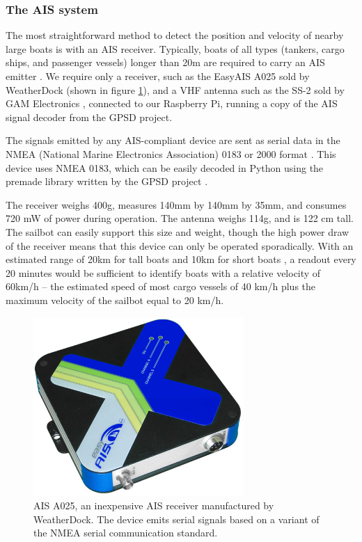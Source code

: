 \subsubsection{\label{sec:method:proposed-design:ais}The AIS system}
The most straightforward method to detect the position and velocity of nearby large boats is with an AIS receiver. Typically, boats of all types (tankers, cargo ships, and passenger vessels) longer than 20m are required to carry an AIS emitter \cite{us-ais-requirements}. We require only a receiver, such as the EasyAIS A025 sold by WeatherDock (shown in figure \ref{fig:easyais-a025}), and a VHF antenna such as the SS-2 sold by GAM Electronics \cite{gam-electronics__ss-2}, connected to our Raspberry Pi, running a copy of the AIS signal decoder from the GPSD project.

The signals emitted by any AIS-compliant device are sent as serial data in the NMEA (National Marine Electronics Association) 0183 or 2000 format \cite{nmea__standards}. This device uses NMEA 0183, which can be easily decoded in Python using the premade library written by the GPSD project \cite{gpsd__overview}.

The receiver weighs 400g, measures 140mm by 140mm by 35mm, and consumes 720 mW of power during operation. The antenna weighs 114g, and is 122 cm tall. The sailbot can easily support this size and weight, though the high power draw of the receiver means that this device can only be operated sporadically. With an estimated range of 20km for tall boats and 10km for short boats \cite{mca-uk__mgn324}, a readout every 20 minutes would be sufficient to identify boats with a relative velocity of 60km/h -- the estimated speed of most cargo vessels of 40 km/h plus the maximum velocity of the sailbot equal to 20 km/h.

\begin{figure}
\centering
\includegraphics[width=80mm,natwidth=540,natheight=459]{"./image/ais-a025"}
\caption[AIS A025 by WeatherDock.]{\label{fig:easyais-a025}AIS A025, an inexpensive AIS receiver manufactured by WeatherDock. The device emits serial signals based on a variant of the NMEA serial communication standard.}
\end{figure}

